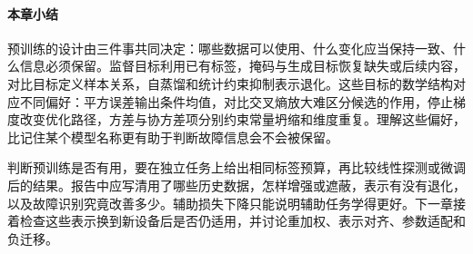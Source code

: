 \paragraph{本章小结}
预训练的设计由三件事共同决定：哪些数据可以使用、什么变化应当保持一致、什么信息必须保留。监督目标利用已有标签，掩码与生成目标恢复缺失或后续内容，对比目标定义样本关系，自蒸馏和统计约束抑制表示退化。这些目标的数学结构对应不同偏好：平方误差输出条件均值，对比交叉熵放大难区分候选的作用，停止梯度改变优化路径，方差与协方差项分别约束常量坍缩和维度重复。理解这些偏好，比记住某个模型名称更有助于判断故障信息会不会被保留。

判断预训练是否有用，要在独立任务上给出相同标签预算，再比较线性探测或微调后的结果。报告中应写清用了哪些历史数据，怎样增强或遮蔽，表示有没有退化，以及故障识别究竟改善多少。辅助损失下降只能说明辅助任务学得更好。下一章接着检查这些表示换到新设备后是否仍适用，并讨论重加权、表示对齐、参数适配和负迁移。
